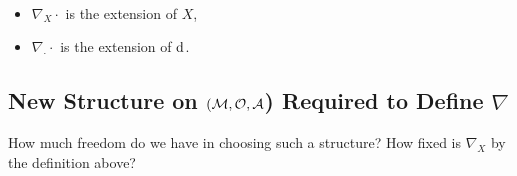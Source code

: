 \documentclass[11pt, a4paper, twocolumn]{article} %
\begin{document}
\begin{note}~
    \begin{itemize}
        \item $\nabla_X \cdot $ is the extension of $X$,
        \item $\nabla_\cdot\cdot$ is the extension of $\operatorname{d\!}$\,.
    \end{itemize}
\end{note}
\subsection[New Structure on (M,O,A) to Define Nabla]{New Structure on $(\mathcal{M}, \mathcal{O}, \mathcal{A}$) Required to Define $\nabla$}
    How much freedom do we have in choosing such a structure? How fixed is $\nabla_X$ by the definition above?
\end{document}
